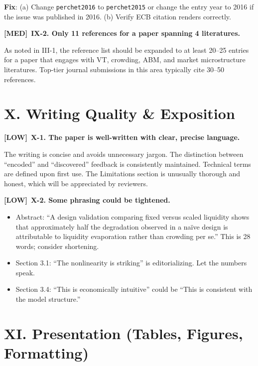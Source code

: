 \documentclass[12pt,a4paper]{article}
\newcommand{\MED}{\textbf{\textcolor{warncolor}{[MED]}}}
\newcommand{\LOW}{\textbf{\textcolor{okgreen}{[LOW]}}}
\begin{document}
\textbf{Fix}: (a) Change \texttt{perchet2016} to \texttt{perchet2015} or change the entry year to 2016 if the issue was published in 2016. (b) Verify ECB citation renders correctly.

\medskip

\MED\ \textbf{IX-2. Only 11 references for a paper spanning 4 literatures.}

As noted in III-1, the reference list should be expanded to at least 20--25 entries for a paper that engages with VT, crowding, ABM, and market microstructure literatures. Top-tier journal submissions in this area typically cite 30--50 references.


\section*{X. Writing Quality \& Exposition}

\LOW\ \textbf{X-1. The paper is well-written with clear, precise language.}

The writing is concise and avoids unnecessary jargon. The distinction between ``encoded'' and ``discovered'' feedback is consistently maintained. Technical terms are defined upon first use. The Limitations section is unusually thorough and honest, which will be appreciated by reviewers.

\medskip

\LOW\ \textbf{X-2. Some phrasing could be tightened.}

\begin{itemize}
  \item Abstract: ``A design validation comparing fixed versus scaled liquidity shows that approximately half the degradation observed in a na\"ive design is attributable to liquidity evaporation rather than crowding per se.'' This is 28 words; consider shortening.
  \item Section 3.1: ``The nonlinearity is striking'' is editorializing. Let the numbers speak.
  \item Section 3.4: ``This is economically intuitive'' could be ``This is consistent with the model structure.''
\end{itemize}


\section*{XI. Presentation (Tables, Figures, Formatting)}
\end{document}
